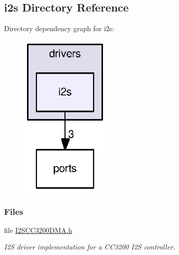 \subsection{i2s Directory Reference}
\label{dir_9291a2fd02cdc69926ab855d12f4ed59}
Directory dependency graph for i2s\+:
\nopagebreak
\begin{figure}[H]
\begin{center}
\leavevmode
\includegraphics[width=123pt]{dir_9291a2fd02cdc69926ab855d12f4ed59_dep}
\end{center}
\end{figure}
\subsubsection*{Files}
\begin{DoxyCompactItemize}
\item 
file \hyperlink{_i2_s_c_c3200_d_m_a_8h}{I2\+S\+C\+C3200\+D\+M\+A.\+h}
\begin{DoxyCompactList}\small\item\em I2\+S driver implementation for a C\+C3200 I2\+S controller. \end{DoxyCompactList}\end{DoxyCompactItemize}
